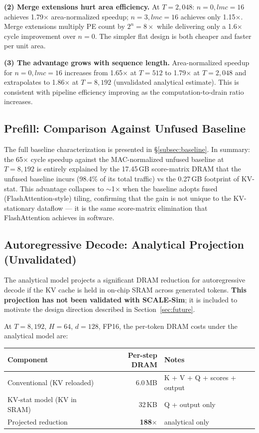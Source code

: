 \documentclass[11pt]{article}
\begin{document}
\textbf{(2) Merge extensions hurt area efficiency.}
At \(T = 2{,}048\): \(n = 0, lmc = 16\) achieves 1.79$\times$
area-normalized speedup; \(n = 3, lmc = 16\) achieves only
1.15$\times$.
Merge extensions multiply PE count by \(2^n = 8\times\) while
delivering only a 1.6$\times$ cycle improvement over \(n = 0\).
The simpler flat design is both cheaper and faster per unit area.

\textbf{(3) The advantage grows with sequence length.}
Area-normalized speedup for \(n = 0, lmc = 16\) increases from
1.65$\times$ at \(T = 512\) to 1.79$\times$ at \(T = 2{,}048\)
and extrapolates to 1.86$\times$ at \(T = 8{,}192\)
(unvalidated analytical estimate).
This is consistent with pipeline efficiency improving as the
computation-to-drain ratio increases.

\subsection{Prefill: Comparison Against Unfused Baseline}

The full baseline characterization is presented in
\S\ref{subsec:baseline}.
In summary: the 65$\times$ cycle speedup against the MAC-normalized
unfused baseline at \(T = 8{,}192\) is entirely explained by the
17.45\,GB score-matrix DRAM that the unfused baseline incurs
(98.4\% of its total traffic) vs the 0.27\,GB footprint of KV-stat.
This advantage collapses to \(\sim\)1$\times$ when the baseline
adopts fused (FlashAttention-style) tiling, confirming that the
gain is not unique to the KV-stationary dataflow --- it is the
same score-matrix elimination that FlashAttention achieves in
software.

\subsection{Autoregressive Decode: Analytical Projection (Unvalidated)}

The analytical model projects a significant DRAM reduction for
autoregressive decode if the KV cache is held in on-chip SRAM
across generated tokens.
\textbf{This projection has not been validated with SCALE-Sim};
it is included to motivate the design direction described in
Section~\ref{sec:future}.

At \(T = 8{,}192\), \(H = 64\), \(d = 128\), FP16, the
per-token DRAM costs under the analytical model are:

\begin{center}
\begin{tabular}{lrl}
\toprule
Component & Per-step DRAM & Notes \\
\midrule
Conventional (KV reloaded) & 6.0\,MB & K + V + Q + scores + output \\
KV-stat model (KV in SRAM) & 32\,KB  & Q + output only \\
\midrule
Projected reduction & \textbf{188$\times$} & analytical only \\
\bottomrule
\end{tabular}
\end{center}
\end{document}
